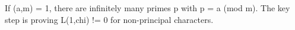 If (a,m) = 1, there are infinitely many primes p with p = a (mod m). The key step is proving L(1,chi) != 0 for non-principal characters.

